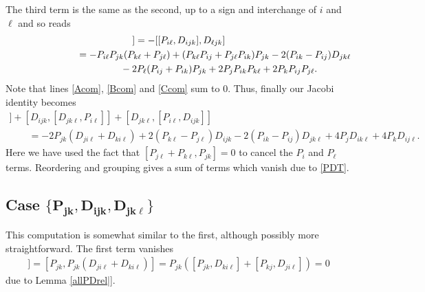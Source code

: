 \documentclass[pdftex]{sigma}
\numberwithin{equation}{section}
\begin{document}
The third term is the same as the second, up to a sign and interchange of $i$ and $\ell$ and so reads
\begin{gather}
[ D_{jk\ell}, [ P_{i\ell}, D_{ijk}]]= - [[ P_{i\ell}, D_{ijk}], D_{\ell jk}] \nonumber\\
\hphantom{[ D_{jk\ell}, [ P_{i\ell}, D_{ijk}]]}{}
=  -P_{i \ell}P_{jk}(P_{k\ell}+P_{j\ell}) +(P_{k\ell} P_{ij}+P_{j\ell}P_{ik}) P_{jk}-2(P_{ik}-P_{ij})D_{jk\ell}\nonumber\\
\hphantom{[ D_{jk\ell}, [ P_{i\ell}, D_{ijk}]]=}{}- 2P_{\ell}(P_{ij}+P_{ik}) P_{jk} +2P_{j}P_{ik}P_{k\ell}+2P_k P_{i j} P_{j\ell}.\label{Ccom}
 \end{gather}
 Note that lines \eqref{Acom}, \eqref{Bcom} and \eqref{Ccom} sum to 0.
 Thus, finally our Jacobi identity becomes
 \begin{gather*}
  [ P_{i \ell}, [ D_{ ijk}, D_{jkl}]] +[ D_{ ijk}, [D_{jk\ell}, P_{i \ell}]] + [ D_{jk\ell}, [ P_{i\ell}, D_{ijk}]]\\
 \qquad = -2P_{jk}(D_{j i \ell} + D_{k i \ell})+2(P_{k \ell}-P_{j \ell})D_{ijk} -2(P_{ik}-P_{ij})D_{jk\ell}
 + 4P_j D_{ik\ell}+4P_k D_{ij\ell}.
 \end{gather*}
 Here we have used the fact that $[ P_{j\ell} +P_{k \ell}, P_{jk}]=0$ to cancel the $P_i$ and $P_{\ell}$ terms. Reordering and grouping gives a sum of terms which vanish due to \eqref{PDT}.

\subsection[Case \{ P\_jk, D\_ ijk, D\_ jkl\}]{Case $\boldsymbol{\{ P_{jk}, D_{ ijk}, D_{ jk\ell}\}}$}
This computation is somewhat similar to the first, although possibly more straightforward.
The first term vanishes
\begin{gather*}
 [ P_{jk}, [ D_{ ijk}, D_{jkl}]] = [P_{jk}, P_{jk}(D_{ji\ell} +D_{ki\ell}) ]
 = P_{jk}( [P_{jk},D_{k i\ell} ]+ [P_{kj}, D_{ji\ell}])=0
 \end{gather*}
due to Lemma \ref{allPDrel|}.
\end{document}
